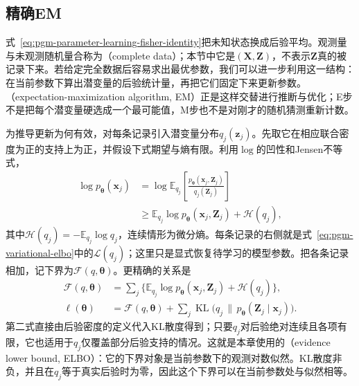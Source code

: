 \subsection{精确EM}
\label{sec:pgm-parameter-learning-em}

式~\eqref{eq:pgm-parameter-learning-fisher-identity}把未知状态换成后验平均。观测量与未观测随机量合称为（complete data）；本节中它是$(\bm{X},\bm{Z})$，不表示$\bm{Z}$真的被记录下来。若给定完全数据后容易求出最优参数，我们可以进一步利用这一结构：在当前参数下算出潜变量的后验统计量，再把它们固定下来更新参数。（expectation-maximization algorithm, EM）正是这样交替进行推断与优化；E步不是把每个潜变量硬选成一个最可能值，M步也不是对刚才的随机猜测重新计数。

为推导更新为何有效，对每条记录引入潜变量分布$q_j(\bm{z}_j)$。先取它在相应联合密度为正的支持上为正，并假设下式期望与熵有限。利用$\log$的凹性和Jensen不等式，
\begin{equation}
  \begin{aligned}
    \log p_{\bm{\theta}}(\bm{x}_j)
      &=\log\mathbb{E}_{q_j}
        \left[\frac{p_{\bm{\theta}}(\bm{x}_j,\bm{Z}_j)}
                    {q_j(\bm{Z}_j)}\right]\\
      &\geq
        \mathbb{E}_{q_j}\log p_{\bm{\theta}}
             (\bm{x}_j,\bm{Z}_j)+\mathcal{H}(q_j),
  \end{aligned}
  \label{eq:pgm-parameter-learning-jensen}
\end{equation}
其中$\mathcal{H}(q_j)=-\mathbb{E}_{q_j}\log q_j$，连续情形为微分熵。每条记录的右侧就是式~\eqref{eq:pgm-variational-elbo}中的$\mathcal{L}(q_j)$；这里只是显式恢复待学习的模型参数。把各条记录相加，记下界为$\mathcal{F}(q,\bm{\theta})$。更精确的关系是
\begin{equation}
  \begin{aligned}
    \mathcal{F}(q,\bm{\theta})
      &=\sum_j\{\mathbb{E}_{q_j}
          \log p_{\bm{\theta}}(\bm{x}_j,\bm{Z}_j)
                      +\mathcal{H}(q_j)\},\\
    \ell(\bm{\theta})
      &=\mathcal{F}(q,\bm{\theta})
        +\sum_j\operatorname{KL}
          \bigl(q_j\,\|\,p_{\bm{\theta}}(\bm{Z}_j\mid\bm{x}_j)\bigr).
  \end{aligned}
  \label{eq:pgm-parameter-learning-elbo-identity}
\end{equation}
第二式直接由后验密度的定义代入KL散度得到；只要$q_j$对后验绝对连续且各项有限，它也适用于$q_j$仅覆盖部分后验支持的情况。这就是本章使用的（evidence lower bound, ELBO）：它的下界对象是当前参数下的观测对数似然。KL散度非负，并且在$q_j$等于真实后验时为零，因此这个下界可以在当前参数处与似然相等。

